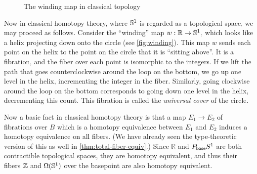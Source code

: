 \begin{figure}\centering
  \caption{The winding map in classical topology}\label{fig:winding}
\end{figure}

Now in classical homotopy theory, where $\mathbb{S}^1$ is regarded as a topological space, we may proceed as follows.
%
Consider the ``winding'' map $w:\mathbb{R}\to \mathbb{S} ^1$, which looks like a helix projecting down onto the circle (see \autoref{fig:winding}).
This map $w$ sends each point on the helix to the point on the circle that it is ``sitting above''.
It is a fibration, and the fiber over each point is isomorphic to the integers.
If we lift the path that goes counterclockwise around the loop on the bottom, we go up one level in the helix, incrementing the integer in the fiber.
Similarly, going clockwise around the loop on the bottom corresponds to going down one level in the helix, decrementing this count.
This fibration is called the \emph{universal cover} of the circle.
%
%
%

Now a basic fact in classical homotopy theory is that a map $E_1\to E_2$ of fibrations over $B$ which is a homotopy equivalence between $E_1$ and $E_2$ induces a homotopy equivalence on all fibers.
(We have already seen the type-theoretic version of this as well in \autoref{thm:total-fiber-equiv}.)
Since $\mathbb{R}$ and $P_{\mathsf{base}} S^1$ are both contractible topological spaces, they are homotopy equivalent, and thus their fibers $\mathbb{Z}$ and $\Omega(\mathbb{S} ^1)$ over the basepoint are also homotopy equivalent.

